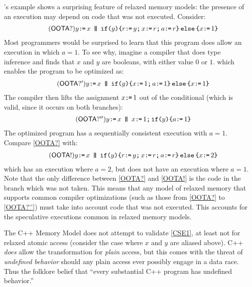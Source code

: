 \citeauthor{DBLP:journals/toplas/Lochbihler13}'s example shows a surprising feature of
relaxed memory models: the presence of an execution may depend on code that was not executed. Consider:
\begin{gather}
  \taglabel{OOTA?}
    y\GETS x
  \PAR
    \IF{y}\THEN r\GETS y\SEMI x\GETS r\SEMI a\GETS r \ELSE x\GETS1 \FI
\end{gather}
Most programmers would be surprised to learn that this program does allow
an execution in which $a=1$. To see why, imagine a compiler that does type inference
and finds that $x$ and $y$ are booleans, with either value $0$ or $1$. which enables the
program to be optimized as:
\begin{gather}
  \taglabel{OOTA?'}
    y\GETS x
  \PAR
    \IF{y}\THEN x\GETS 1\SEMI a\GETS 1 \ELSE x\GETS1 \FI
\end{gather}
The compiler then lifts the assignment $x\texttt{:}\mkern-1mu\texttt{=}\,1$ out of the conditional
(which is valid, since it occurs on both branches):
\begin{gather}
  \taglabel{OOTA?''}
    y\GETS x
  \PAR
    x\GETS1\SEMI \IF{y}\THEN a\GETS 1 \FI
\end{gather}
The optimized program has a sequentially consistent execution with $a=1$.
Compare \ref{OOTA?} with:
\begin{gather}
  \taglabel{OOTA!}
    y\GETS x
  \PAR
    \IF{y}\THEN r\GETS y\SEMI x\GETS r\SEMI a\GETS r \ELSE x\GETS2 \FI
\end{gather}
which has an execution where $a=2$, but does not have an execution where $a=1$. Note that the only 
difference between \ref{OOTA?} and \ref{OOTA!} is the code in the branch
which was not taken. This means that any model of relaxed memory that supports
common compiler optimizations (such as those from \ref{OOTA?} to \ref{OOTA?''})
must take into account code that was not executed. This accounts for
the speculative executions common in relaxed memory models.

The C++ Memory Model \cite{Batty:2011:MCC:1926385.1926394} does not attempt
to validate \ref{CSE1}, at least not for relaxed atomic access (consider the
case where $x$ and $y$ are aliased above).  C++ \emph{does} allow the
transformation for \emph{plain} access, but this comes with the threat of
\emph{undefined behavior} should any plain access ever possibly engage in a
data race.  Thus the folklore belief that ``every substantial C++ program has
undefined behavior.''


